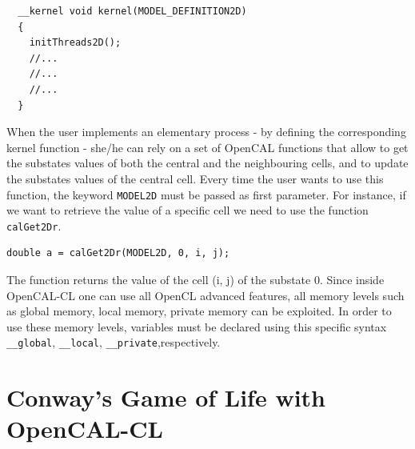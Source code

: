 \begin{lstlisting} 
  __kernel void kernel(MODEL_DEFINITION2D)
  {
    initThreads2D();
    //...
    //...
    //...
  }
\end{lstlisting}

When the user implements an elementary process - by defining
the corresponding kernel function - she/he can rely on a set of OpenCAL functions
that allow to get the substates values of both the central and the
neighbouring cells, and to update the substates values of the central
cell. Every time the user wants to use this function, the keyword \verb'MODEL2D' must be passed
as first parameter. For instance, if we
want to retrieve the value of a specific cell we need to use the function
\verb'calGet2Dr'.

\begin{lstlisting}[numbers=none] 
	double a = calGet2Dr(MODEL2D, 0, i, j);
\end{lstlisting}

The function returns the value of the cell (i, j) of the substate
0. Since inside OpenCAL-CL one can use all OpenCL advanced features, all
memory levels such as global memory, local memory, private memory
can be exploited. In order to use these memory
levels, variables must be declared using this specific syntax
\verb'__global', \verb'__local', \verb'__private',respectively.

\section{Conway's Game of Life with OpenCAL-CL}
 
